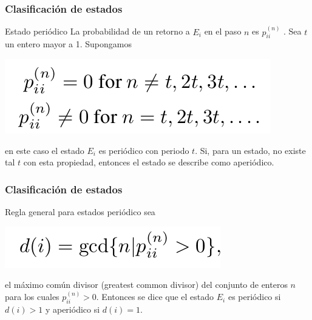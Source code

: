 \documentclass[spanish]{beamer}
\begin{document}
\begin{frame}
\frametitle{Clasificación de estados}
\begin{block}{Estado periódico}
La probabilidad de un retorno a $E_{i}$ en el paso $n$ es $p_{ii}^{(n)}$ . Sea $t$ un entero mayor a 1. Supongamos 

\begin{center}
\includegraphics[scale=0.4]{im29}
\end{center}
en este caso el estado $E_i$ es periódico con periodo $t$. Si, para un estado, no existe tal $t$ con esta propiedad, entonces el estado se describe como aperiódico.
\end{block}

\end{frame}

\begin{frame}
\frametitle{Clasificación de estados}
\begin{block}{Regla general para estados periódico}
sea

\begin{center}
\includegraphics[scale=0.4]{im30}
\end{center}

el máximo común divisor (greatest common divisor) del conjunto de enteros $n$ para los cuales $p^{(n)}_{ii}> 0$. Entonces se dice que el estado $E_{i}$ es periódico si $d(i)> 1$ y aperiódico si $d (i) = 1$.
\end{block}

\end{frame}
\end{document}
